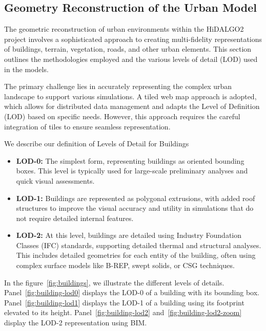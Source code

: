 \documentclass[runningheads]{llncs}
\begin{document}
\subsection{Geometry Reconstruction of the Urban Model}

The geometric reconstruction of urban environments within the HiDALGO2 project involves a sophisticated approach to creating multi-fidelity representations of buildings, terrain, vegetation, roads, and other urban elements. This section outlines the methodologies employed and the various levels of detail (LOD) used in the models.

The primary challenge lies in accurately representing the complex urban landscape to support various simulations. A tiled web map approach is adopted, which allows for distributed data management and adapts the Level of Definition (LOD) based on specific needs. However, this approach requires the careful integration of tiles to ensure seamless representation.

We describe our definition of Levels of Detail for Buildings
\begin{itemize}
    \item \textbf{LOD-0:} The simplest form, representing buildings as oriented bounding boxes. This level is typically used for large-scale preliminary analyses and quick visual assessments.
    \item \textbf{LOD-1:} Buildings are represented as polygonal extrusions, with added roof structures to improve the visual accuracy and utility in simulations that do not require detailed internal features.
    \item \textbf{LOD-2:} At this level, buildings are detailed using Industry Foundation Classes (IFC) standards, supporting detailed thermal and structural analyses. This includes detailed geometries for each entity of the building, often using complex surface models like B-REP, swept solids, or CSG techniques.
\end{itemize}


In the figure~\ref{fig:buildings}, we illustrate the different levels of details. Panel~\ref{fig:building-lod0} displays the LOD-0 of a building with its bounding box.
Panel~\ref{fig:building-lod1} displays the LOD-1 of a building using its footprint elevated to its height. 
Panel~\ref{fig:building-lod2} and~\ref{fig:building-lod2-zoom} display the LOD-2 representation using BIM.
\end{document}
